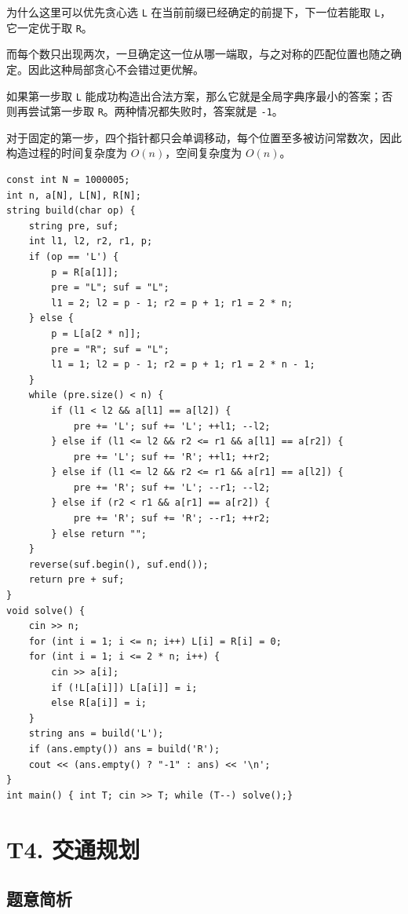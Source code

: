 \documentclass{book}
\newcommand{\code}[1]{\colorbox{codebg}{\texttt{#1}}}  %
\begin{document}
\begin{keybox}{为什么这里可以优先贪心选 \code{L}}
在当前前缀已经确定的前提下，下一位若能取 \code{L}，它一定优于取 \code{R}。

而每个数只出现两次，一旦确定这一位从哪一端取，与之对称的匹配位置也随之确定。因此这种局部贪心不会错过更优解。
\end{keybox}

如果第一步取 \code{L} 能成功构造出合法方案，那么它就是全局字典序最小的答案；否则再尝试第一步取 \code{R}。两种情况都失败时，答案就是 \code{-1}。

对于固定的第一步，四个指针都只会单调移动，每个位置至多被访问常数次，因此构造过程的时间复杂度为 $O(n)$，空间复杂度为 $O(n)$。
\newpage
\begin{lstlisting}[style = code]
const int N = 1000005;
int n, a[N], L[N], R[N];
string build(char op) {
    string pre, suf;
    int l1, l2, r2, r1, p;
    if (op == 'L') {
        p = R[a[1]];
        pre = "L"; suf = "L";
        l1 = 2; l2 = p - 1; r2 = p + 1; r1 = 2 * n;
    } else {
        p = L[a[2 * n]];
        pre = "R"; suf = "L";
        l1 = 1; l2 = p - 1; r2 = p + 1; r1 = 2 * n - 1;
    }
    while (pre.size() < n) {
        if (l1 < l2 && a[l1] == a[l2]) {
            pre += 'L'; suf += 'L'; ++l1; --l2;
        } else if (l1 <= l2 && r2 <= r1 && a[l1] == a[r2]) {
            pre += 'L'; suf += 'R'; ++l1; ++r2;
        } else if (l1 <= l2 && r2 <= r1 && a[r1] == a[l2]) {
            pre += 'R'; suf += 'L'; --r1; --l2;
        } else if (r2 < r1 && a[r1] == a[r2]) {
            pre += 'R'; suf += 'R'; --r1; ++r2;
        } else return "";
    }
    reverse(suf.begin(), suf.end());
    return pre + suf;
}
void solve() {
    cin >> n;
    for (int i = 1; i <= n; i++) L[i] = R[i] = 0;
    for (int i = 1; i <= 2 * n; i++) {
        cin >> a[i];
        if (!L[a[i]]) L[a[i]] = i;
        else R[a[i]] = i;
    }
    string ans = build('L');
    if (ans.empty()) ans = build('R');
    cout << (ans.empty() ? "-1" : ans) << '\n';
}
int main() { int T; cin >> T; while (T--) solve();}
\end{lstlisting}
\newpage
\section{T4. 交通规划} %
    
    
   \subsection{题意简析}
\end{document}
